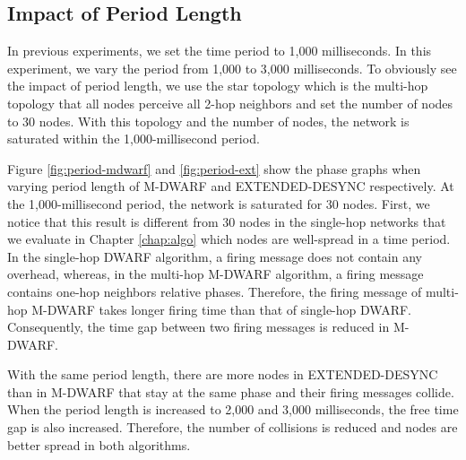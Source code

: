\subsection{Impact of Period Length}
In previous experiments, we set the time period to 1,000 milliseconds. In this experiment, we vary the period from 1,000 to 3,000 milliseconds. To obviously see the impact of period length, we use the star topology which is the multi-hop topology that all nodes perceive all 2-hop neighbors and set the number of nodes to 30 nodes.
With this topology and the number of nodes, the network is saturated within the 1,000-millisecond period. 

Figure \ref{fig:period-mdwarf} and \ref{fig:period-ext} show the phase graphs when varying period length of M-DWARF and EXTENDED-DESYNC respectively. At the 1,000-millisecond period, the network is saturated for 30 nodes. 
First, we notice that this result is different from 30 nodes in the single-hop networks that we evaluate in Chapter \ref{chap:algo} which nodes are well-spread in a time period. 
In the single-hop DWARF algorithm, a firing message does not contain any overhead, whereas, in the multi-hop M-DWARF algorithm, a firing message contains one-hop neighbors relative phases.
Therefore, the firing message of multi-hop M-DWARF takes longer firing time than that of single-hop DWARF.
Consequently, the time gap between two firing messages is reduced in M-DWARF.

With the same period length, there are more nodes in EXTENDED-DESYNC than in M-DWARF that stay at the same phase and their firing messages collide. When the period length is increased to 2,000 and 3,000 milliseconds, the free time gap is also increased. Therefore, the number of collisions is reduced and nodes are better spread in both algorithms. 


